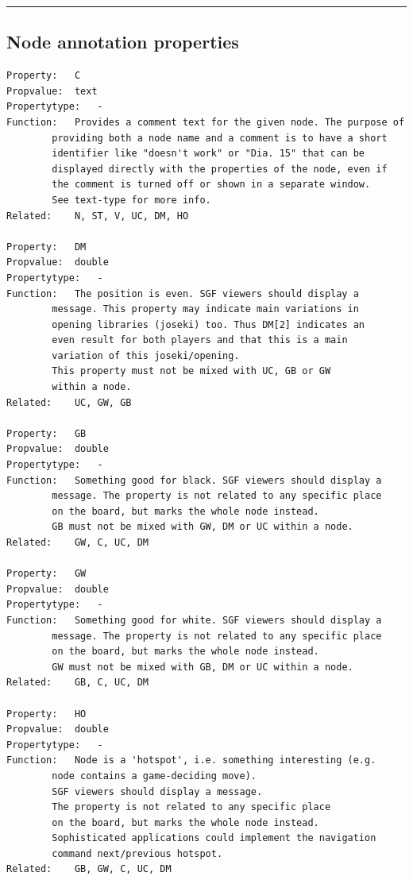 \begin{center}\rule{0.5\linewidth}{0.5pt}\end{center}

\subsection{Node annotation
properties}\label{node-annotation-properties}

\begin{verbatim}
Property:   C
Propvalue:  text
Propertytype:   -
Function:   Provides a comment text for the given node. The purpose of
        providing both a node name and a comment is to have a short
        identifier like "doesn't work" or "Dia. 15" that can be
        displayed directly with the properties of the node, even if
        the comment is turned off or shown in a separate window.
        See text-type for more info.
Related:    N, ST, V, UC, DM, HO

Property:   DM
Propvalue:  double
Propertytype:   -
Function:   The position is even. SGF viewers should display a
        message. This property may indicate main variations in
        opening libraries (joseki) too. Thus DM[2] indicates an
        even result for both players and that this is a main
        variation of this joseki/opening.
        This property must not be mixed with UC, GB or GW
        within a node.
Related:    UC, GW, GB

Property:   GB
Propvalue:  double
Propertytype:   -
Function:   Something good for black. SGF viewers should display a
        message. The property is not related to any specific place
        on the board, but marks the whole node instead.
        GB must not be mixed with GW, DM or UC within a node.
Related:    GW, C, UC, DM

Property:   GW
Propvalue:  double
Propertytype:   -
Function:   Something good for white. SGF viewers should display a
        message. The property is not related to any specific place
        on the board, but marks the whole node instead.
        GW must not be mixed with GB, DM or UC within a node.
Related:    GB, C, UC, DM

Property:   HO
Propvalue:  double
Propertytype:   -
Function:   Node is a 'hotspot', i.e. something interesting (e.g.
        node contains a game-deciding move).
        SGF viewers should display a message.
        The property is not related to any specific place
        on the board, but marks the whole node instead.
        Sophisticated applications could implement the navigation
        command next/previous hotspot.
Related:    GB, GW, C, UC, DM


\end{verbatim}
